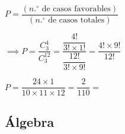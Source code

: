 \begin{enumerate}
	$P = \dfrac{(n.^\circ \text{ de casos favorables})}{(n.^\circ \text{ de casos totales})}$

	$\implies P = \dfrac{C_{3}^{4}}{C_{3}^{12}} = \dfrac{\dfrac{4!}{3! \times 1!}}{\dfrac{12!}{3! \times 9!}} = \dfrac{4! \times 9!}{12!}$

	$P = \dfrac{24 \times 1}{10 \times 11 \times 12} = \dfrac{2}{110} = $

	\vspace{6mm}
\end{enumerate}







\subsection*{Álgebra}

